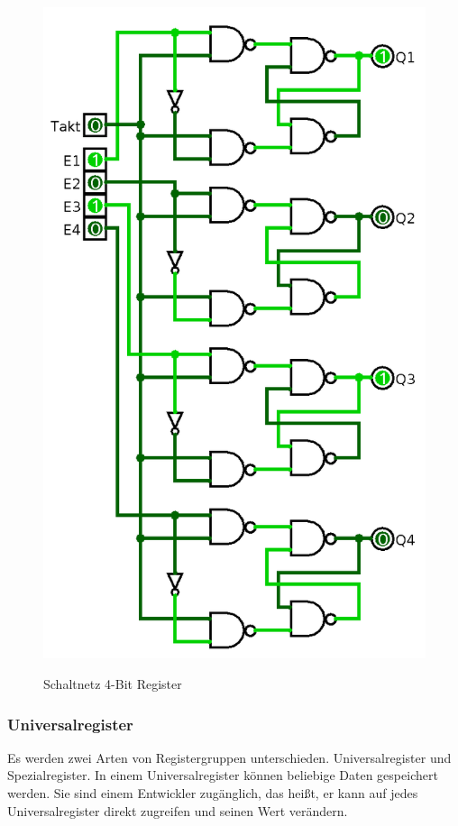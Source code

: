\documentclass[a4paper,12pt]{article}
\begin{document}
\newpage
\label{page:4bitreg}
\begin{figure}[!htb]
\centering
\caption{Schaltnetz 4-Bit Register}
\includegraphics[scale=0.35]{4bitreg}
\centering
\label{fig:4bitreg}
\end{figure}
\newpage


\subsubsection{Universalregister}
Es werden zwei Arten von Registergruppen unterschieden. Universalregister und Spezialregister. In einem Universalregister können beliebige Daten gespeichert werden. Sie sind einem Entwickler zugänglich, das heißt, er kann auf jedes Universalregister direkt zugreifen und seinen Wert verändern. 
\end{document}
